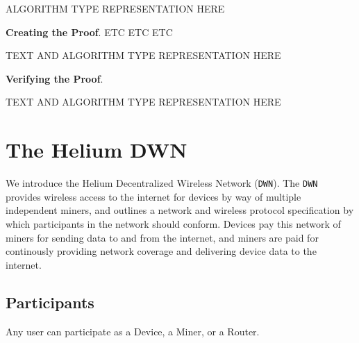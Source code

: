 \documentclass[letterpaper,11pt]{report}
\begin{document}
ALGORITHM TYPE REPRESENTATION HERE\newline

\textbf{Creating the Proof}. ETC ETC ETC\newline

TEXT AND ALGORITHM TYPE REPRESENTATION HERE\newline

\textbf{Verifying the Proof}.\newline

TEXT AND ALGORITHM TYPE REPRESENTATION HERE

\section{The Helium DWN}

We introduce the Helium Decentralized Wireless Network (\verb|DWN|). The \verb|DWN| provides wireless access to the internet for devices by way of multiple independent miners, and outlines a network and wireless protocol specification by which participants in the network should conform. Devices pay this network of miners for sending data to and from the internet, and miners are paid for continously providing network coverage and delivering device data to the internet. 

\subsection{Participants}

Any user can participate as a Device, a Miner, or a Router.\newline
\end{document}
